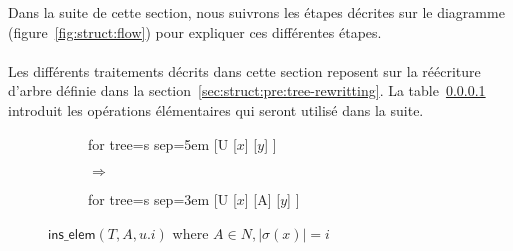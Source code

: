 Dans la suite de cette section, nous suivrons les étapes décrites sur le diagramme (figure~\ref{fig:struct:flow}) pour expliquer ces différentes étapes.

\paragraph{}
Les différents traitements décrits dans cette section reposent sur la réécriture d'arbre définie dans la section~\ref{sec:struct:pre:tree-rewritting}.
La table~\ref{} introduit les opérations élémentaires qui seront utilisé dans la suite.

\begin{figure}[htb]
	\centering
	\begin{subfigure}[c]{0.4\textwidth}
		\centering
		\begin{adjustbox}{valign=c, max width=\textwidth}
			\begin{forest}
			for tree={s sep=5em}
			[U
				[$x$]
				[$y$]
			]
			\end{forest}
		\end{adjustbox}
		\caption*{}
	\end{subfigure}
	\begin{subfigure}[c]{0.1\textwidth}
		\centering
		\huge{$\Rightarrow$}
	\end{subfigure}
	\begin{subfigure}[c]{0.4\textwidth}
		\centering
		\begin{adjustbox}{valign=c, max width=\textwidth}
			\begin{forest}
			for tree={s sep=3em}
			[U
				[$x$]
				[A]
				[$y$]
			]
			\end{forest}
		\end{adjustbox}
		\caption*{}
	\end{subfigure}
	\caption{$\textsf{ins\_elem}(T, A, u.i)$ where $A \in N, |\sigma(x)| = i$}
	\label{fig:sch:op:insElem}
\end{figure}

